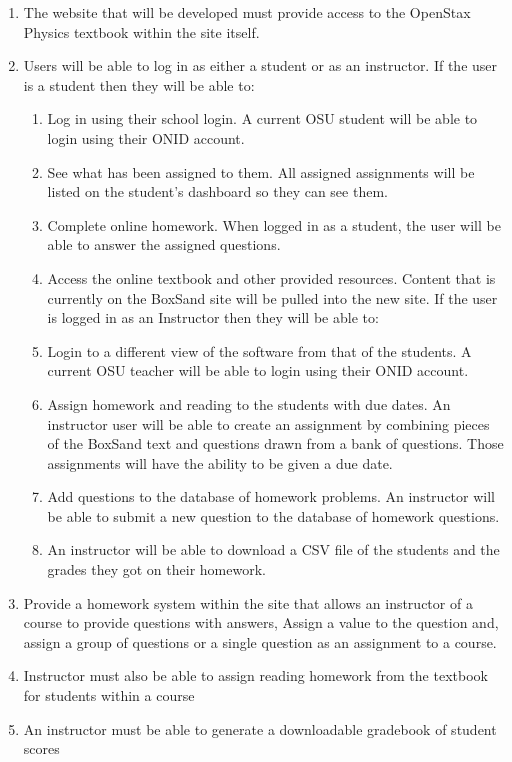 \documentclass[onecolumn, draftclsnofoot,10pt, compsoc]{IEEEtran}
\begin{document}
\begin{enumerate}
\item The website that will be developed must provide access to the OpenStax Physics textbook within the site itself. 
\item Users will be able to log in as either a student or as an instructor. If the user is a student then they will be able to:
\begin{enumerate}
    \item Log in using their school login. A current OSU student will be able to login using their ONID account. 
    \item See what has been assigned to them. All assigned assignments will be listed on the student’s dashboard so they can see them.
    \item Complete online homework. When logged in as a student, the user will be able to answer the assigned questions. 
    \item Access the online textbook and other provided resources. Content that is currently on the BoxSand site will be pulled into the new site.
\newline If the user is logged in as an Instructor then they will be able to:
    \item Login to a different view of the software from that of the students. A current OSU teacher will be able to login using their ONID account.
    \item Assign homework and reading to the students with due dates. An instructor user will be able to create an assignment by combining pieces of the BoxSand text and questions drawn from a bank of questions. Those assignments will have the ability to be given a due date.
    \item Add questions to the database of homework problems. An instructor will be able to submit a new question to the database of homework questions.
    \item An instructor will be able to download a CSV file of the students and the grades they got on their homework.
\end{enumerate}
\item Provide a homework system within the site that allows an instructor of a course to provide questions with answers, Assign a value to the question and, assign a group of questions or a single question as an assignment to a course.
\item Instructor must also be able to assign reading homework from the textbook for students within a course
\item An instructor must be able to generate a downloadable gradebook of student scores
\end{enumerate}
\end{document}
